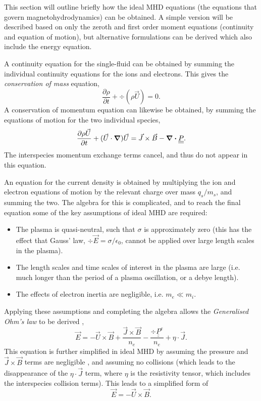 This section will outline briefly how the ideal MHD equations (the equations that govern magnetohydrodynamics) can be obtained. A simple version will be described based on only the zeroth and first order moment equations (continuity and equation of motion), but alternative formulations can be derived which also include the energy equation. 

A continuity equation for the single-fluid can be obtained by summing the individual continuity equations for the ions and electrons. This gives the \textit{conservation of mass} equation,
\begin{equation} \frac{\partial \rho}{\partial t} + \div (\rho \vec{U}) = 0. \end{equation}
A conservation of momentum equation can likewise be obtained, by summing the equations of motion for the two individual species,
\begin{equation} \frac{\partial \rho \vec{U}}{\partial t} + (\vec{U} \cdot \grad)\vec{U} =\vec{J} \times \vec{B} - \div \underline{\underline{P}} .\end{equation}
The interspecies momentum exchange terms cancel, and thus do not appear in this equation.

An equation for the current density is obtained by multiplying the ion and electron equations of motion by the relevant charge over mass $q_s/m_s$, and summing the two. The algebra for this is complicated, and to reach the final equation some of the key assumptions of ideal MHD are required:
\begin{itemize}
	\item{The plasma is quasi-neutral, such that $\sigma$ is approximately zero (this has the effect that Gauss' law, $\div \vec{E} = \sigma / \epsilon_0$, cannot be applied over large length scales in the plasma).}
	\item{The length scales and time scales of interest in the plasma are large (i.e. much longer than the period of a plasma oscillation, or a debye length).}
	\item{The effects of electron inertia are negligible, i.e. $m_e \ll m_i$.}
\end{itemize}
Applying these assumptions and completing the algebra allows the \textit{Generalised Ohm's law} to be derived \cite{Piel2017, Chen2015}, 
\begin{equation} \vec{E} = -\vec{U}\times\vec{B} + \frac{\vec{J} \times \vec{B}}{n_e} - \frac{\div \underline{\underline{P}}^e}{n_e} + \eta \cdot \vec{J}. \end{equation}
This equation is further simplified in ideal MHD by assuming the pressure and $\vec{J} \times \vec{B}$ terms are negligible \cite{Chen2015}, and assuming no collisions (which leads to the disappearance of the $\eta \cdot \vec{J}$ term, where $\eta$ is the resistivity tensor, which includes the interspecies collision terms). This leads to a simplified form of 
\begin{equation} \vec{E} = -\vec{U}\times\vec{B} . \end{equation}

